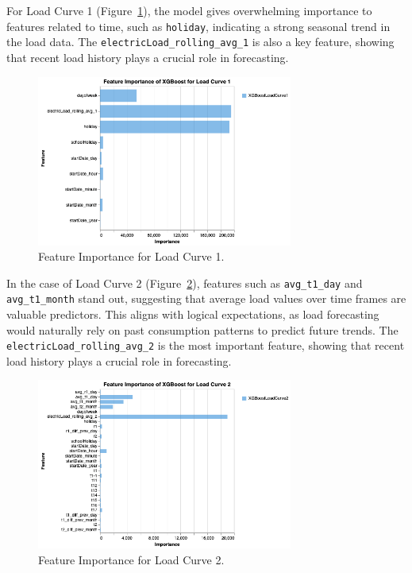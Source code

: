 \documentclass{article} %
\begin{document}
For Load Curve 1 (Figure~\ref{fig:feature_importance_1}), the model gives overwhelming importance to features related to time, such as \texttt{holiday}, indicating a strong seasonal trend in the load data. The \texttt{electricLoad\_rolling\_avg\_1} is also a key feature, showing that recent load history plays a crucial role in forecasting.
\begin{figure}[H]
    \centering
    \includegraphics[width=0.75\textwidth]{ressources/FeatureImportance/Feature Importance 1.png}
    \caption{Feature Importance for Load Curve 1.}
    \label{fig:feature_importance_1}
\end{figure}
In the case of Load Curve 2 (Figure~\ref{fig:feature_importance_2}), features such as \texttt{avg\_t1\_day} and \texttt{avg\_t1\_month} stand out, suggesting that average load values over time frames are valuable predictors. This aligns with logical expectations, as load forecasting would naturally rely on past consumption patterns to predict future trends. The \texttt{electricLoad\_rolling\_avg\_2} is the most important feature, showing that recent load history plays a crucial role in forecasting.
\begin{figure}[H]
    \centering
    \includegraphics[width=0.75\textwidth]{ressources/FeatureImportance/Feature Importance 2.png}
    \caption{Feature Importance for Load Curve 2.}
    \label{fig:feature_importance_2}
\end{figure}
\end{document}
